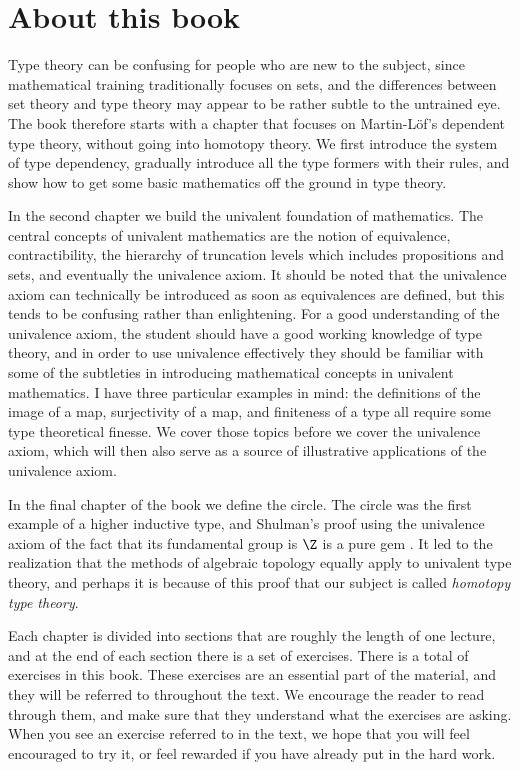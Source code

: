\section*{About this book}

Type theory can be confusing for people who are new to the subject, since mathematical training traditionally focuses on sets, and the differences between set theory and type theory may appear to be rather subtle to the untrained eye. The book therefore starts with a chapter that focuses on Martin-L\"of's dependent type theory, without going into homotopy theory. We first introduce the system of type dependency, gradually introduce all the type formers with their rules, and show how to get some basic mathematics off the ground in type theory.

In the second chapter we build the univalent foundation of mathematics. The central concepts of univalent mathematics are the notion of equivalence, contractibility, the hierarchy of truncation levels which includes propositions and sets, and eventually the univalence axiom. It should be noted that the univalence axiom can technically be introduced as soon as equivalences are defined, but this tends to be confusing rather than enlightening. For a good understanding of the univalence axiom, the student should have a good working knowledge of type theory, and in order to use univalence effectively they should be familiar with some of the subtleties in introducing mathematical concepts in univalent mathematics. I have three particular examples in mind: the definitions of the image of a map, surjectivity of a map, and finiteness of a type all require some type theoretical finesse. We cover those topics before we cover the univalence axiom, which will then also serve as a source of illustrative applications of the univalence axiom.

In the final chapter of the book we define the circle. The circle was the first example of a higher inductive type, and Shulman's proof using the univalence axiom of the fact that its fundamental group is $\Z$ is a pure gem \cite{LicataShulman}. It led to the realization that the methods of algebraic topology equally apply to univalent type theory, and perhaps it is because of this proof that our subject is called \emph{homotopy type theory}.

Each chapter is divided into sections that are roughly the length of one lecture, and at the end of each section there is a set of exercises. There is a total of  exercises in this book. These exercises are an essential part of the material, and they will be referred to throughout the text. We encourage the reader to read through them, and make sure that they understand what the exercises are asking. When you see an exercise referred to in the text, we hope that you will feel encouraged to try it, or feel rewarded if you have already put in the hard work.

